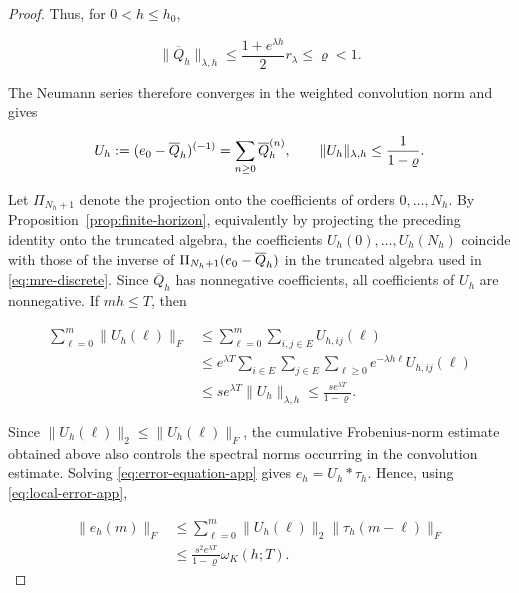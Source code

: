 \documentclass[3p,12pt,authoryear]{elsarticle}
\theoremstyle{definition}
\theoremstyle{remark}
\newcommand{\ez}{e_{\mathstrut 0}}
\begin{document}
\begin{proof}
Thus, for $0<h\leq h_0$,

\begin{equation*}
\|\overline Q_h\|_{\lambda,h}
\leq
\frac{1+e^{\lambda h}}{2}r_\lambda
\leq\varrho<1.
\end{equation*}

The Neumann series therefore converges in the weighted convolution norm and gives

\begin{equation*}
U_h:=(\ez-\overline Q_h)^{(-1)}
=
\sum_{n\geq0}\overline Q_h^{(n)},
\qquad
\|U_h\|_{\lambda,h}
\leq
\frac{1}{1-\varrho}.
\end{equation*}

Let $\Pi_{N_h+1}$ denote the projection onto the coefficients of orders
$0,\ldots,N_h$. By Proposition~\ref{prop:finite-horizon}, equivalently by
projecting the preceding identity onto the truncated algebra, the coefficients
$U_h(0),\ldots,U_h(N_h)$ coincide with those of the inverse of
$\Pi_{N_h+1}(\ez-\overline Q_h)$ in the truncated algebra used in
\eqref{eq:mre-discrete}. Since $\overline Q_h$ has nonnegative coefficients,
all coefficients of $U_h$ are nonnegative. If $mh\leq T$, then

\begin{equation*}
\begin{aligned}
\sum_{\ell=0}^{m}\|U_h(\ell)\|_F
&\leq
\sum_{\ell=0}^{m}\sum_{i,j\in E}U_{h,ij}(\ell)\\
&\leq
e^{\lambda T}
\sum_{i\in E}\sum_{j\in E}\sum_{\ell\geq0}
e^{-\lambda h\ell}U_{h,ij}(\ell)\\
&\leq
s e^{\lambda T}\|U_h\|_{\lambda,h}
\leq
\frac{s e^{\lambda T}}{1-\varrho}.
\end{aligned}
\end{equation*}

Since $\|U_h(\ell)\|_2\leq\|U_h(\ell)\|_F$, the cumulative Frobenius-norm estimate obtained above also controls the spectral norms occurring in the convolution estimate. Solving \eqref{eq:error-equation-app} gives $e_h=U_h*\tau_h$. Hence, using \eqref{eq:local-error-app},

\begin{equation*}
\begin{aligned}
\|e_h(m)\|_F
&\leq
\sum_{\ell=0}^{m}\|U_h(\ell)\|_2
\|\tau_h(m-\ell)\|_F\\
&\leq
\frac{s^2e^{\lambda T}}{1-\varrho}
\omega_K(h;T).
\end{aligned}
\end{equation*}


\end{proof}
\end{document}
